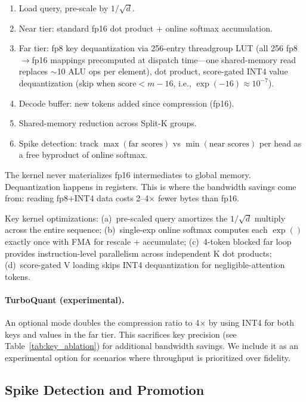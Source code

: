 \documentclass{article}
\begin{document}
\begin{enumerate}
\item Load query, pre-scale by $1/\sqrt{d}$.
\item Near tier: standard fp16 dot product + online softmax accumulation.
\item Far tier: fp8 key dequantization via 256-entry threadgroup LUT
  (all 256 fp8$\to$fp16 mappings precomputed at dispatch time---one
  shared-memory read replaces $\sim$10 ALU ops per element),
  dot product, score-gated INT4 value dequantization (skip when
  $\text{score} < m - 16$, i.e., $\exp(-16) \approx 10^{-7}$).
\item Decode buffer: new tokens added since compression (fp16).
\item Shared-memory reduction across Split-K groups.
\item Spike detection: track $\max(\text{far scores})$ vs
  $\min(\text{near scores})$ per head as a free byproduct of online
  softmax.
\end{enumerate}

The kernel never materializes fp16 intermediates to global memory.
Dequantization happens in registers. This is where the bandwidth
savings come from: reading fp8+INT4 data costs 2--4$\times$ fewer bytes
than fp16.

Key kernel optimizations: (a)~pre-scaled query amortizes the
$1/\sqrt{d}$ multiply across the entire sequence; (b)~single-exp online
softmax computes each $\exp()$ exactly once with FMA for rescale +
accumulate; (c)~4-token blocked far loop provides instruction-level
parallelism across independent K dot products; (d)~score-gated V
loading skips INT4 dequantization for negligible-attention tokens.

\paragraph{TurboQuant (experimental).} An optional mode doubles the
compression ratio to 4$\times$ by using INT4 for both keys and values
in the far tier. This sacrifices key precision (see
Table~\ref{tab:key_ablation}) for additional bandwidth savings. We
include it as an experimental option for scenarios where throughput is
prioritized over fidelity.

\subsection{Spike Detection and Promotion}
\label{sec:promotion}
\end{document}
